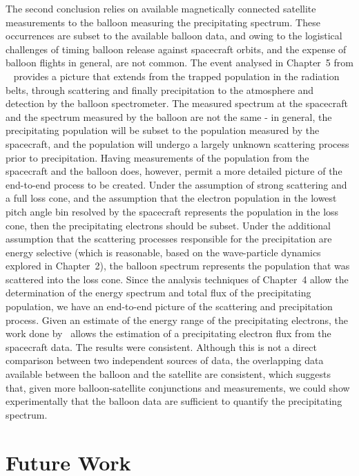 The second conclusion relies on available magnetically connected satellite measurements to the balloon measuring the precipitating spectrum. These occurrences are subset to the available balloon data, and owing to the logistical challenges of timing balloon release against spacecraft orbits, and the expense of balloon flights in general, are not common. The event analysed in Chapter~5 from ~\citet{Halford2015} provides a picture that extends from the trapped population in the radiation belts, through scattering and finally precipitation to the atmosphere and detection by the balloon spectrometer. The measured spectrum at the spacecraft and the spectrum measured by the balloon are not the same - in general, the precipitating population will be subset to the population measured by the spacecraft, and the population will undergo a largely unknown scattering process prior to precipitation. Having measurements of the population from the spacecraft and the balloon does, however, permit a more detailed picture of the end-to-end process to be created. Under the assumption of strong scattering and a full loss cone, and the assumption that the electron population in the lowest pitch angle bin resolved by the spacecraft represents the population in the loss cone, then the precipitating electrons should be subset. Under the additional assumption that the scattering processes responsible for the precipitation are energy selective (which is reasonable, based on the wave-particle dynamics explored in Chapter~2), the balloon spectrum represents the population that was scattered into the loss cone. Since the analysis techniques of Chapter~4 allow the determination of the energy spectrum and total flux of the precipitating population, we have an end-to-end picture of the scattering and precipitation process. Given an estimate of the energy range of the precipitating electrons, the work done by~\citet{kasahara2018} allows the estimation of a precipitating electron flux from the spacecraft data. The results were consistent. Although this is not a direct comparison between two independent sources of data, the overlapping data available between the balloon and the satellite are consistent, which suggests that, given more balloon-satellite conjunctions and measurements, we could show experimentally that the balloon data are sufficient to quantify the precipitating spectrum.

\section{Future Work}

